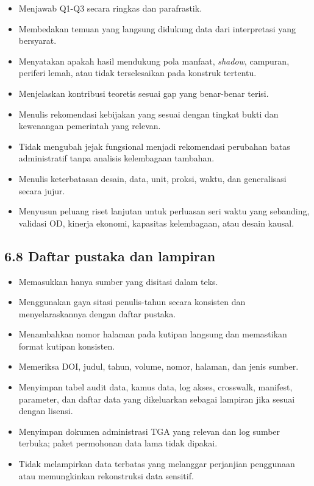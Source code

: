 \documentclass[
  indonesian,
  11pt,
]{article}
\providecommand{\tightlist}{%
  \setlength{\itemsep}{0pt}\setlength{\parskip}{0pt}}
\renewcommand{\tightlist}{%
  \setlength{\itemsep}{0.22em}%
  \setlength{\parskip}{0pt}%
}
\begin{document}
\begin{itemize}
\tightlist
\item[$\square$]
  Menjawab Q1-Q3 secara ringkas dan parafrastik.
\item[$\square$]
  Membedakan temuan yang langsung didukung data dari interpretasi yang
  bersyarat.
\item[$\square$]
  Menyatakan apakah hasil mendukung pola manfaat, \emph{shadow},
  campuran, periferi lemah, atau tidak terselesaikan pada konstruk
  tertentu.
\item[$\square$]
  Menjelaskan kontribusi teoretis sesuai gap yang benar-benar terisi.
\item[$\square$]
  Menulis rekomendasi kebijakan yang sesuai dengan tingkat bukti dan
  kewenangan pemerintah yang relevan.
\item[$\square$]
  Tidak mengubah jejak fungsional menjadi rekomendasi perubahan batas
  administratif tanpa analisis kelembagaan tambahan.
\item[$\square$]
  Menulis keterbatasan desain, data, unit, proksi, waktu, dan
  generalisasi secara jujur.
\item[$\square$]
  Menyusun peluang riset lanjutan untuk perluasan seri waktu yang
  sebanding, validasi OD, kinerja ekonomi, kapasitas kelembagaan, atau
  desain kausal.
\end{itemize}

\subsection{6.8 Daftar pustaka dan
lampiran}\label{daftar-pustaka-dan-lampiran}

\begin{itemize}
\tightlist
\item[$\square$]
  Memasukkan hanya sumber yang disitasi dalam teks.
\item[$\square$]
  Menggunakan gaya sitasi penulis-tahun secara konsisten dan
  menyelaraskannya dengan daftar pustaka.
\item[$\square$]
  Menambahkan nomor halaman pada kutipan langsung dan memastikan format
  kutipan konsisten.
\item[$\square$]
  Memeriksa DOI, judul, tahun, volume, nomor, halaman, dan jenis sumber.
\item[$\square$]
  Menyimpan tabel audit data, kamus data, log akses, crosswalk,
  manifest, parameter, dan daftar data yang dikeluarkan sebagai lampiran
  jika sesuai dengan lisensi.
\item[$\square$]
  Menyimpan dokumen administrasi TGA yang relevan dan log sumber
  terbuka; paket permohonan data lama tidak dipakai.
\item[$\square$]
  Tidak melampirkan data terbatas yang melanggar perjanjian penggunaan
  atau memungkinkan rekonstruksi data sensitif.
\end{itemize}
\end{document}
